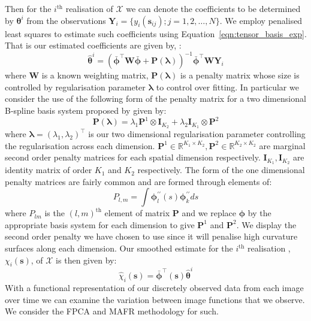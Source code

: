 \documentclass{article}
\newcommand{\ve}[1]{\bm{{#1}}}
\begin{document}
Then for the $i^\text{th}$ realisation of $\mathcal{X}$ we can denote the coefficients to be determined by $\ve{\theta}^i$ from the observations $\ve{Y}_i = \{y_i(\ve{s}_{ij}) ; j=1,2,\dots,N\}$. We employ penalised least squares to estimate such coefficients using Equation~\ref{eqn:tensor_basis_exp}. That is our estimated coefficients are given by, \cite{ramsay_functional_2010}:
\begin{equation}
  \hat{\ve{\theta}}^i = \left( \bar{\ve{\phi}}^\top \ve{W} \bar{\ve{\phi}} + \ve{P}\left( \ve{\lambda} \right)\right)^{-1}\bar{\ve{\phi}}^\top \ve{W} \ve{Y}_i
  \label{eqn:plss}
\end{equation}
where $\ve{W}$ is a known weighting matrix, $\ve{P}\left( \ve{\lambda} \right)$ is a penalty matrix whose size is controlled by regularisation parameter $\ve{\lambda}$ to control over fitting. In particular we consider the use of the following form of the penalty matrix for a two dimensional B-spline basis system proposed by \citet{wood_low-rank_2006} given by:
\begin{equation}
  \ve{P}\left( \ve{\lambda} \right) = \lambda_1 \ve{P}^1 \otimes \ve{I}_{K_2} + \lambda_2 \ve{I}_{K_1} \otimes \ve{P}^2
  \label{eqn:penalty}
\end{equation}
where $\ve{\lambda}=\left( \lambda_1, \lambda_2 \right)^\top$ is our two dimensional regularisation parameter controlling the regularisation across each dimension. $\ve{P}^1 \in \mathbb{R}^{K_1 \times K_2}, \ve{P}^2 \in \mathbb{R}^{K_2 \times K_2}$ are marginal second order penalty matrices for each spatial dimension respectively. $\ve{I}_{K_1}, \ve{I}_{K_2}$ are identity matrix of order $K_1$ and $K_2$ respectively. The form of the one dimensional penalty matrices are fairly common and are formed through elements of:
\begin{equation}
  P_{l,m} = \int \ve{\phi}_l^{\prime \prime}(s) \ve{\phi}_k^{\prime \prime} ds
  \label{eqn:pen_form}
\end{equation}
where $P_{lm}$ is the $\left( l, m  \right)^\text{th}$ element of matrix $\ve{P}$ and we replace $\ve{\phi}$ by the appropriate basis system for each dimension to give $\ve{P}^1$ and $\ve{P}^2$. We display the second order penalty we have chosen to use since it will penalise high curvature surfaces along each dimension. Our smoothed estimate for the $i^\text{th}$ realisation , $\chi_i(\ve{s})$, of $\mathcal{X}$ is then given by:
\begin{equation}
  \hat{\chi}_i\left( \ve{s} \right) = \bar{\ve{\phi}}^\top \left( \ve{s} \right) \hat{\ve{\theta}}^i
  \label{eqn:smooth_estimator}
\end{equation}
With a functional representation of our discretely observed data from each image over time we can examine the variation between image functions that we observe. We consider the FPCA and MAFR methodology for such.
\end{document}
